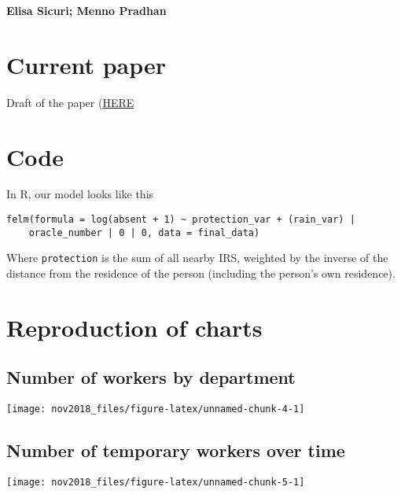 \documentclass[]{article}
\begin{document}
\textbf{Elisa Sicuri; Menno Pradhan}

\vspace{3mm}

\newpage

\section{Current paper}\label{current-paper}

Draft of the paper
(\href{https://docs.google.com/document/d/1bUWRBCgVcgjSPHchIQxiTG8Vwv5hV1GLU4Tlu386sWA/edit#}{HERE}

\section{Code}\label{code}

In R, our model looks like this

\begin{verbatim}
felm(formula = log(absent + 1) ~ protection_var + (rain_var) | 
    oracle_number | 0 | 0, data = final_data)
\end{verbatim}

Where \texttt{protection} is the sum of all nearby IRS, weighted by the
inverse of the distance from the residence of the person (including the
person's own residence).

\newpage

\section{Reproduction of charts}\label{reproduction-of-charts}

\subsection{Number of workers by
department}\label{number-of-workers-by-department}

\begin{center}\texttt{[image: nov2018\_files/figure-latex/unnamed-chunk-4-1]} \end{center}

\subsection{Number of temporary workers over
time}\label{number-of-temporary-workers-over-time}

\begin{center}\texttt{[image: nov2018\_files/figure-latex/unnamed-chunk-5-1]} \end{center}
\end{document}
